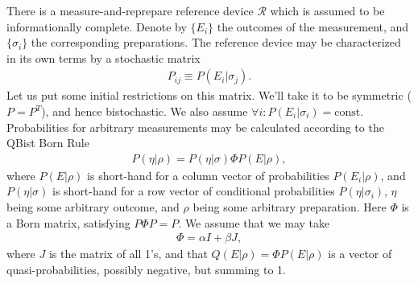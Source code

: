 \documentclass[11pt]{article}
\begin{document}
There is a measure-and-reprepare reference device $\mathcal{R}$  which is assumed to be informationally complete. Denote by $\{E_i\}$ the outcomes of the measurement, and $\{\sigma_i\}$ the corresponding preparations. The reference device may be characterized in its own terms by a stochastic matrix 
\begin{align}
P_{ij}\equiv P(E_i|\sigma_j).	
\end{align}
Let us put some initial restrictions on this matrix. We'll take it to be symmetric ($P=P^T$), and hence bistochastic. We also assume $\forall i: P(E_i|\sigma_i)=\text{const}$. 
 Probabilities for arbitrary measurements may be calculated according to the QBist Born Rule
\begin{align}
P(\eta|\rho)=P(\eta|\sigma)\Phi P(E|\rho),	
\end{align}
where $P(E|\rho)$ is short-hand for a column vector of probabilities $P(E_i|\rho)$, and $P(\eta|\sigma)$ is short-hand for a row vector of conditional probabilities $P(\eta|\sigma_i)$, $\eta$ being some arbitrary outcome, and $\rho$ being some arbitrary preparation. Here $\Phi$ is a Born matrix, satisfying $P\Phi P=P$. We assume that we may take
\begin{align}
\Phi = \alpha I + \beta J,	
\end{align}
where $J$ is the matrix of all 1's, and that $Q(E|\rho)=\Phi P(E|\rho)$ is a vector of quasi-probabilities, possibly negative, but summing to 1.
\end{document}
